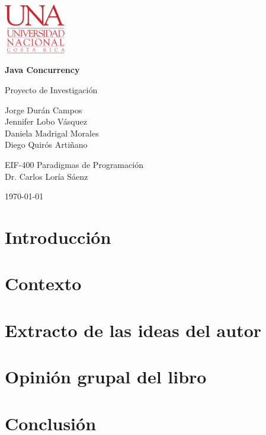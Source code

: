 \documentclass[11pt, article, natbib]{article}
\begin{document}
\begin{titlepage}
	\includegraphics[width=0.2\textwidth]{./logo-UNA blanco.png}      
   	\begin{changemargin}{4.5cm}{0cm}
       	\textbf{\huge Java Concurrency}

       	\vspace{0.2cm}
       	\LARGE Proyecto de Investigación
            
       	\vspace{3cm}
		\Large
        Jorge Durán Campos \\
        Jennifer Lobo Vásquez \\
        Daniela Madrigal Morales \\
       	Diego Quirós Artiñano \\

       	\vspace{3cm}
       
		EIF-400 Paradigmas de Programación \\
       	Dr. Carlos Loría Sáenz \\

       	\vfill
    	
		\today
	\end{changemargin}
\end{titlepage}

\onecolumn
    \renewcommand{\contentsname}{\large Índice \\ \hrulefill}
\tableofcontents
\newpage

\section{Introducción}

\newpage
\section{Contexto}

\section{Extracto de las ideas del autor}

\section{Opinión grupal del libro}

\newpage
\section{Conclusión}


\newpage
\onecolumn

\nocite{temp}
%  
% 
\printbibliography
\end{document}
